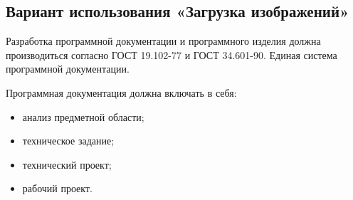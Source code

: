 \subsection{Вариант использования «Загрузка изображений»}

Разработка программной документации и программного изделия должна производиться согласно ГОСТ 19.102-77 и ГОСТ 34.601-90. Единая система программной документации.

Программная документация должна включать в себя:
\begin{itemize}
	\item анализ предметной области;
	\item техническое задание;
	\item технический проект;
	\item рабочий проект.
\end{itemize}
